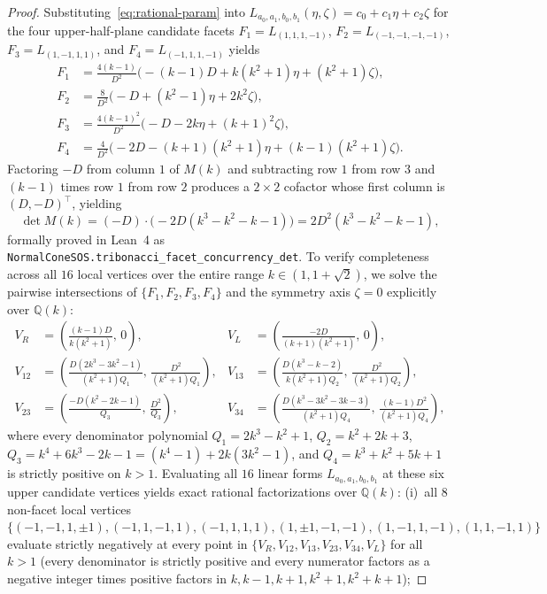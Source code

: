 \documentclass[11pt,a4paper]{article}
\newcommand{\QQ}{\mathbb{Q}}
\begin{document}
\begin{proof}
Substituting~\eqref{eq:rational-param} into $L_{a_0,a_1,b_0,b_1}(\eta,\zeta) = c_0 + c_1 \eta + c_2 \zeta$ for the four upper-half-plane candidate facets $F_1 = L_{(1,1,1,-1)}$, $F_2 = L_{(-1,-1,-1,-1)}$, $F_3 = L_{(1,-1,1,1)}$, and $F_4 = L_{(-1,1,1,-1)}$ yields
\begin{align}
  F_1 &= \frac{4(k-1)}{D^2}\bigl(-(k-1)D + k(k^2+1)\eta + (k^2+1)\zeta\bigr),\\
  F_2 &= \frac{8}{D^2}\bigl(-D + (k^2-1)\eta + 2k^2 \zeta\bigr),\\
  F_3 &= \frac{4(k-1)^2}{D^2}\bigl(-D - 2k\eta + (k+1)^2\zeta\bigr),\\
  F_4 &= \frac{4}{D^2}\bigl(-2D - (k+1)(k^2+1)\eta + (k-1)(k^2+1)\zeta\bigr).
\end{align}
Factoring $-D$ from column $1$ of $M(k)$ and subtracting row $1$ from row $3$ and $(k-1)$ times row $1$ from row $2$ produces a $2\times 2$ cofactor whose first column is $(D, -D)^\top$, yielding
\begin{equation}
  \det M(k) = (-D)\cdot\bigl(-2D(k^3-k^2-k-1)\bigr) = 2D^2(k^3-k^2-k-1),
\end{equation}
formally proved in Lean~4 as \texttt{NormalConeSOS.\allowbreak tribonacci\_facet\_concurrency\_det}.
To verify completeness across all $16$ local vertices over the entire range $k \in (1, 1+\sqrt{2})$, we solve the pairwise intersections of $\{F_1, F_2, F_3, F_4\}$ and the symmetry axis $\zeta = 0$ explicitly over $\QQ(k)$:
\begin{align*}
  V_R &= \left(\frac{(k-1)D}{k(k^2+1)},\, 0\right), &
  V_L &= \left(\frac{-2D}{(k+1)(k^2+1)},\, 0\right), \\
  V_{12} &= \left(\frac{D(2k^3-3k^2-1)}{(k^2+1)Q_1},\, \frac{D^2}{(k^2+1)Q_1}\right), &
  V_{13} &= \left(\frac{D(k^3-k-2)}{k(k^2+1)Q_2},\, \frac{D^2}{(k^2+1)Q_2}\right), \\
  V_{23} &= \left(\frac{-D(k^2-2k-1)}{Q_3},\, \frac{D^2}{Q_3}\right), &
  V_{34} &= \left(\frac{D(k^3-3k^2-3k-3)}{(k^2+1)Q_4},\, \frac{(k-1)D^2}{(k^2+1)Q_4}\right),
\end{align*}
where every denominator polynomial $Q_1 = 2k^3 - k^2 + 1$, $Q_2 = k^2 + 2k + 3$, $Q_3 = k^4 + 6k^3 - 2k - 1 = (k^4-1) + 2k(3k^2-1)$, and $Q_4 = k^3 + k^2 + 5k + 1$ is strictly positive on $k > 1$.
Evaluating all $16$ linear forms $L_{a_0,a_1,b_0,b_1}$ at these six upper candidate vertices yields exact rational factorizations over $\QQ(k)$:
(i)~all $8$ non-facet local vertices $\{(-1,-1,1,\pm 1), (-1,1,-1,1), (-1,1,1,1), (1,\pm 1,-1,-1), (1,-1,1,-1), (1,1,-1,1)\}$ evaluate strictly negatively at every point in $\{V_R, V_{12}, V_{13}, V_{23}, V_{34}, V_L\}$ for all $k > 1$ (every denominator is strictly positive and every numerator factors as a negative integer times positive factors in $k, k-1, k+1, k^2+1, k^2+k+1$);

\end{proof}
\end{document}
